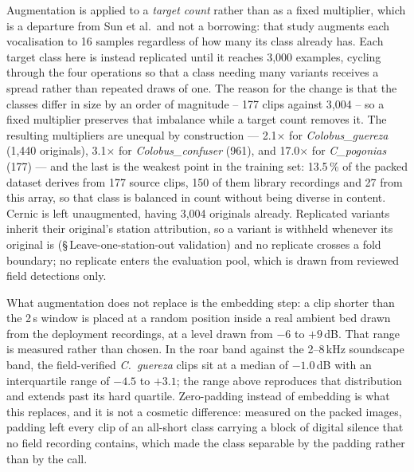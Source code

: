 \documentclass[review,3p,times]{elsarticle}
\begin{document}
Augmentation is applied to a \emph{target count} rather than as a fixed
multiplier, which is a departure from Sun et al.\ and not a borrowing: that
study augments each vocalisation to 16 samples regardless of how many its class
already has. Each target class here is instead replicated until it reaches
3{,}000 examples, cycling through the four operations so that a class needing
many variants receives a spread rather than repeated draws of one. The reason
for the change is that the classes differ in size by an order of magnitude --
177 clips against 3{,}004 -- so a fixed multiplier preserves that imbalance
while a target count removes it. The
resulting multipliers are unequal by construction --- 2.1$\times$ for
\textit{Colobus\_guereza} (1{,}440 originals), 3.1$\times$ for
\textit{Colobus\_confuser} (961), and 17.0$\times$ for \textit{C\_pogonias}
(177) --- and the last is the weakest point in the training set: 13.5\,\% of the
packed dataset derives from 177 source clips, 150 of them library recordings and
27 from this array, so that class is balanced in
count without being diverse in content. Cernic is left unaugmented, having
3{,}004 originals already. Replicated variants inherit their original's station
attribution, so a variant is withheld whenever its original is
(\S\,Leave-one-station-out validation) and no replicate crosses a fold boundary;
no replicate enters the evaluation pool, which is drawn from reviewed field
detections only.

What augmentation does not replace is the embedding step: a clip
shorter than the 2\,s window is placed at a random position inside a real
ambient bed drawn from the deployment recordings, at a level drawn from
$-6$ to $+9$\,dB. That range is measured rather than chosen. In the roar band
against the 2--8\,kHz soundscape band, the field-verified \textit{C.\ guereza}
clips sit at a median of $-1.0$\,dB with an interquartile range of $-4.5$ to
$+3.1$; the range above reproduces that distribution and extends past its hard
quartile. Zero-padding instead of embedding is what this replaces, and it is not
a cosmetic difference: measured on the packed images, padding left every clip of
an all-short class carrying a block of digital silence that no field recording
contains, which made the class separable by the padding rather than by the call.
\end{document}
